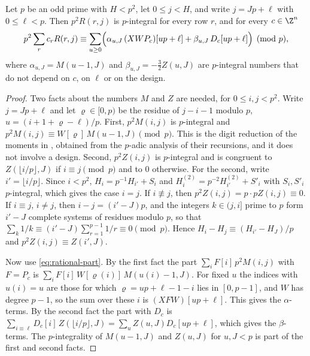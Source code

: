 \begin{lemma}\label{lem:digits}
Let $p$ be an odd prime with $H<p^2$, let $0\le j<H$, and write $j=Jp+\ell$ with $0\le\ell<p$. Then
$p^2R(r,j)$ is $p$-integral for every row $r$, and for every $c\in\Z^n$
\[
 p^2\sum_rc_rR(r,j)\equiv\sum_{u\ge0}\Bigl(\alpha_{u,J}\,(XWP_c)[up+\ell]+\beta_{u,J}\,D_c[up+\ell]\Bigr)
 \pmod p ,
\]
where $\alpha_{u,J}=M(u-1,J)$ and $\beta_{u,J}=-\tfrac32Z(u,J)$ are $p$-integral numbers that do not depend on
$c$, on $\ell$ or on the design.
\end{lemma}

\begin{proof}
Two facts about the numbers $M$ and $Z$ are needed, for $0\le i,j<p^2$. Write $j=Jp+\ell$ and let
$\varrho\in[0,p)$ be the residue of $j-i-1$ modulo $p$, $u=(i+1+\varrho-\ell)/p$. First, $p^2M(i,j)$ is
$p$-integral and $p^2M(i,j)\equiv W[\varrho]\,M(u-1,J)\pmod p$. This is the digit reduction of the moments in
\cite[\S3]{OpenAI2026}, obtained from the $p$-adic analysis of their recursions, and it does not involve a design.
Second, $p^2Z(i,j)$ is $p$-integral and is congruent to $Z(\lfloor i/p\rfloor,J)$ if $i\equiv j\pmod p$ and to
$0$ otherwise. For the second, write $i'=\lfloor i/p\rfloor$. Since $i<p^2$, $H_i=p^{-1}H_{i'}+S_i$ and
$H^{(2)}_i=p^{-2}H^{(2)}_{i'}+S'_i$ with $S_i,S'_i$ $p$-integral, which gives the case $i=j$. If $i\not\equiv j$,
then $p^2Z(i,j)=p\cdot pZ(i,j)\equiv0$. If $i\equiv j$, $i\ne j$, then $i-j=(i'-J)p$, and the integers
$k\in(j,i]$ prime to $p$ form $i'-J$ complete systems of residues modulo $p$, so that
$\sum_k1/k\equiv(i'-J)\sum_{r=1}^{p-1}1/r\equiv0\pmod p$. Hence $H_i-H_j\equiv(H_{i'}-H_J)/p$ and
$p^2Z(i,j)\equiv Z(i',J)$.

Now use \eqref{eq:rational-part}. By the first fact the part $\sum_iF[i]\,p^2M(i,j)$ with $F=P_c$ is
$\sum_iF[i]\,W[\varrho(i)]\,M(u(i)-1,J)$. For fixed $u$ the indices with $u(i)=u$ are those for which
$\varrho=up+\ell-1-i$ lies in $[0,p-1]$, and $W$ has degree $p-1$, so the sum over these $i$ is
$(XFW)[up+\ell]$. This gives the $\alpha$-terms. By the second fact the part with $D_c$ is
$\sum_{i\equiv\ell}D_c[i]\,Z(\lfloor i/p\rfloor,J)=\sum_uZ(u,J)D_c[up+\ell]$, which gives the $\beta$-terms.
The $p$-integrality of $M(u-1,J)$ and $Z(u,J)$ for $u,J<p$ is part of the first and second facts.
\end{proof}

